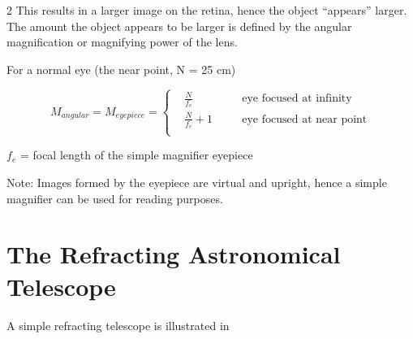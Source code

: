 \begin{multicols}{2}
This results in a larger image on the retina, hence the object ``appears'' larger. The amount the object appears to be larger is defined by the angular magnification or magnifying power of the lens.

For a normal eye (the near point, N = 25 cm)



\begin{equation}\label{e:mag}
	M_{angular} = M_{eyepiece} =
	\left\{
	\begin{alignedat}{2}
		&\frac{N}{f_e}		&& \quad\text {eye focused at infinity}\\
		&\frac{N}{f_e} + 1 	&& \quad\text {eye focused at near point}\\
	 \end{alignedat}
	\right.
\end{equation}


$f_e$ = focal length of the simple magnifier eyepiece

Note: Images formed by the eyepiece are virtual and upright, hence a simple magnifier can be used for reading purposes.

\section{The Refracting Astronomical Telescope}
A simple refracting telescope is illustrated in 


\end{multicols}
